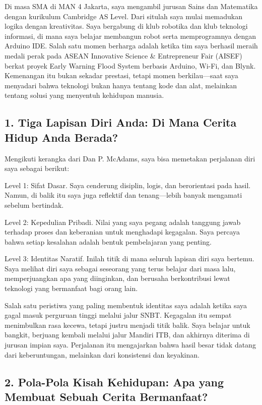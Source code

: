 \documentclass[
  letterpaper,
  DIV=11,
  numbers=noendperiod]{scrreprt}
\begin{document}
Di masa SMA di MAN 4 Jakarta, saya mengambil jurusan Sains dan
Matematika dengan kurikulum Cambridge AS Level. Dari situlah saya mulai
memadukan logika dengan kreativitas. Saya bergabung di klub robotika dan
klub teknologi informasi, di mana saya belajar membangun robot serta
memprogramnya dengan Arduino IDE. Salah satu momen berharga adalah
ketika tim saya berhasil meraih medali perak pada ASEAN Innovative
Science \& Entrepreneur Fair (AISEF) berkat proyek Early Warning Flood
System berbasis Arduino, Wi-Fi, dan Blynk. Kemenangan itu bukan sekadar
prestasi, tetapi momen berkilau---saat saya menyadari bahwa teknologi
bukan hanya tentang kode dan alat, melainkan tentang solusi yang
menyentuh kehidupan manusia.

\subsection{\texorpdfstring{\textbf{1. Tiga Lapisan Diri Anda: Di Mana
Cerita Hidup Anda
Berada?}}{1. Tiga Lapisan Diri Anda: Di Mana Cerita Hidup Anda Berada?}}\label{tiga-lapisan-diri-anda-di-mana-cerita-hidup-anda-berada}

Mengikuti kerangka dari Dan P. McAdams, saya bisa memetakan perjalanan
diri saya sebagai berikut:

Level 1: Sifat Dasar. Saya cenderung disiplin, logis, dan berorientasi
pada hasil. Namun, di balik itu saya juga reflektif dan tenang---lebih
banyak mengamati sebelum bertindak.

Level 2: Kepedulian Pribadi. Nilai yang saya pegang adalah tanggung
jawab terhadap proses dan keberanian untuk menghadapi kegagalan. Saya
percaya bahwa setiap kesalahan adalah bentuk pembelajaran yang penting.

Level 3: Identitas Naratif. Inilah titik di mana seluruh lapisan diri
saya bertemu. Saya melihat diri saya sebagai seseorang yang terus
belajar dari masa lalu, memperjuangkan apa yang diinginkan, dan berusaha
berkontribusi lewat teknologi yang bermanfaat bagi orang lain.

Salah satu peristiwa yang paling membentuk identitas saya adalah ketika
saya gagal masuk perguruan tinggi melalui jalur SNBT. Kegagalan itu
sempat menimbulkan rasa kecewa, tetapi justru menjadi titik balik. Saya
belajar untuk bangkit, berjuang kembali melalui jalur Mandiri ITB, dan
akhirnya diterima di jurusan impian saya. Perjalanan itu mengajarkan
bahwa hasil besar tidak datang dari keberuntungan, melainkan dari
konsistensi dan keyakinan.

\subsection{\texorpdfstring{\textbf{2. Pola-Pola Kisah Kehidupan: Apa
yang Membuat Sebuah Cerita
Bermanfaat?}}{2. Pola-Pola Kisah Kehidupan: Apa yang Membuat Sebuah Cerita Bermanfaat?}}\label{pola-pola-kisah-kehidupan-apa-yang-membuat-sebuah-cerita-bermanfaat}
\end{document}
